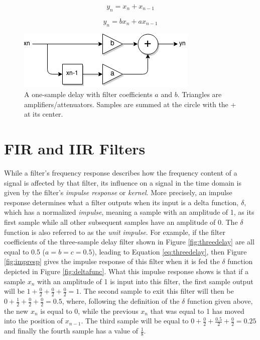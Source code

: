 \begin{equation}
  y_{n} = x_{n} + x_{n-1}
  \label{eq:onedelay1}
\end{equation}

\begin{equation}
  y_{n} = bx_{n} + ax_{n-1}
  \label{eq:onedelay2}
\end{equation}

\begin{figure}[h!]
  \includegraphics[scale=0.8]{img/onedelay}
  \caption{A one-sample delay with filter coefficients $a$ and $b$. Triangles are amplifiers/attenuators. Samples are summed at the circle with the + at its center.}
  \label{fig:onedelay}
\end{figure}

\pagebreak

\section{FIR and IIR Filters}

\noindent While a filter's frequency response describes how the frequency content of a signal is affected by that filter, its influence on a signal in the time domain is given by the filter's \emph{impulse response} or \emph{kernel}. More precisely, an impulse response determines what a filter outputs when its input is a delta function, $\delta$, which has a normalized \emph{impulse}, meaning a sample with an amplitude of 1, as its first sample while all other subsequent samples have an amplitude of 0. The $\delta$ function is also referred to as the \emph{unit impulse}.  For example, if the filter coefficients of the three-sample delay filter shown in Figure \ref{fig:threedelay} are all equal to 0.5 ($a = b = c = 0.5$), leading to Equation \ref{eq:threedelay}, then Figure \ref{fig:impresp} gives the impulse response of this filter when it is fed the $\delta$ function depicted in Figure \ref{fig:deltafunc}. What this impulse response shows is that if a sample $x_{n}$ with an amplitude of 1 is input into this filter, the first sample output will be $1 + \frac{0}{2}+ \frac{0}{2}+ \frac{0}{2} = 1$. The second sample to exit this filter will then be $0 + \frac{1}{2}+ \frac{0}{2}+ \frac{0}{2} = 0.5$, where, following the definition of the $\delta$ function given above, the new $x_{n}$ is equal to 0, while the previous $x_{n}$ that was equal to 1 has moved into the position of $x_{n-1}$. The third sample will be equal to $0 + \frac{0}{2} + \frac{0.5}{2}+ \frac{0}{2} = 0.25$ and finally the fourth sample has a value of $\frac{1}{8}$.

